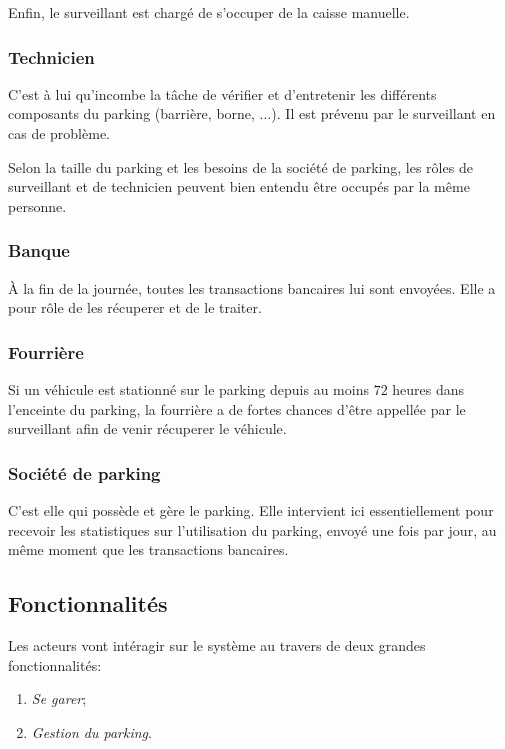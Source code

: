 \documentclass[a4paper]{article}
\begin{document}
Enfin, le surveillant est charg\'e de s'occuper de la caisse manuelle.

\subsubsection{Technicien}
C'est \`a lui qu'incombe la t\^ache de v\'erifier et d'entretenir les diff\'erents
composants du parking (barri\`ere, borne, $\hdots$). Il est pr\'evenu par le surveillant
en cas de probl\`eme. 

Selon la taille du parking et les besoins de la soci\'et\'e de parking, les r\^oles
de surveillant et de technicien peuvent bien entendu \^etre occup\'es par la m\^eme
personne.

\subsubsection{Banque}
\`A la fin de la journ\'ee, toutes les transactions bancaires lui sont envoy\'ees. Elle
a pour r\^ole de les r\'ecuperer et de le traiter.

\subsubsection{Fourri\`ere}
Si un v\'ehicule est stationn\'e sur le parking depuis au moins $72$ heures dans l'enceinte
du parking, la fourri\`ere a de fortes chances d'\^etre appell\'ee par le surveillant afin
de venir r\'ecuperer le v\'ehicule.

\subsubsection{Soci\'et\'e de parking}
C'est elle qui poss\`ede et g\`ere le parking. Elle intervient ici essentiellement pour
recevoir les statistiques sur l'utilisation du parking, envoy\'e une fois par jour, au
m\^eme moment que les transactions bancaires.

\subsection{Fonctionnalit\'es}
Les acteurs vont int\'eragir sur le syst\`eme au travers de deux grandes fonctionnalit\'es:
\begin{enumerate}
	\item \textit{Se garer};
	\item \textit{Gestion du parking}.
\end{enumerate}
\end{document}
